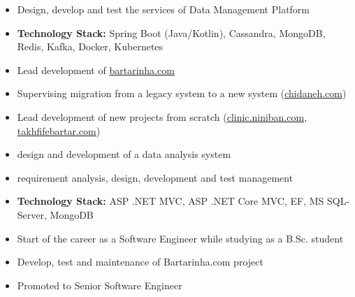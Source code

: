 \documentclass[10pt,a4paper,ragged2e,withhyper]{altacv}
\begin{document}


\makecvheader


\begin{paracol}{2}

\begin{itemize}
\item Design, develop and test the services of Data Management Platform
\item \textbf{Technology Stack:} Spring Boot (Java/Kotlin), Cassandra, MongoDB, Redis, Kafka, Docker, Kubernetes
\end{itemize}

\divider

\begin{itemize}
\item Lead development of \href{https://bartarinha.com}{bartarinha.com}
\item Supervising migration from a legacy system to a new system (\href{https://chidaneh.com}{chidaneh.com})
\item Lead development of new projects from scratch (\href{https://clinic.niniban.com}{clinic.niniban.com}, \href{https://takhfifebartar.com}{takhfifebartar.com})
\item design and development of a data analysis system
\item requirement analysis, design, development and test management
\item \textbf{Technology Stack:} ASP .NET MVC, ASP .NET Core MVC, EF, MS SQL-Server, MongoDB
\end{itemize}

\divider

\begin{itemize}
\item Start of the career as a Software Engineer while studying as a B.Sc. student
\item Develop, test and maintenance of Bartarinha.com project
\item Promoted to Senior Software Engineer
\end{itemize}


\end{paracol}
\end{document}
